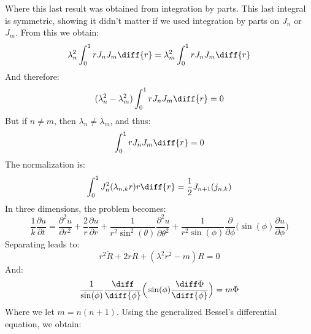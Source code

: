             Where this last result was obtained from integration
            by parts. This last integral is symmetric, showing
            it didn't matter if we used integration by parts on
            $J_{n}$ or $J_{m}$. From this we obtain:
            \begin{equation}
                \lambda_{n}^{2}\int_{0}^{1}rJ_{n}J_{m}\diff{r}
                =\lambda_{m}^{2}\int_{0}^{1}rJ_{n}J_{m}\diff{r}
            \end{equation}
            And therefore:
            \begin{equation}
                (\lambda_{n}^{2}-\lambda_{m}^{2})
                \int_{0}^{1}rJ_{n}J_{m}\diff{r}=0
            \end{equation}
            But if $n\ne{m}$, then $\lambda_{n}\ne\lambda_{m}$,
            and thus:
            \begin{equation}
                \int_{0}^{1}rJ_{n}J_{m}\diff{r}=0
            \end{equation}
            The normalization is:
            \begin{equation}
                \int_{0}^{1}J_{n}^{2}(\lambda_{n,k}r)r\diff{r}=
                \frac{1}{2}J_{n+1}(j_{n,k})
            \end{equation}
            In three dimensions, the problem becomes:
            \begin{equation}
                \frac{1}{k}\frac{\partial{u}}{\partial{t}}=
                \frac{\partial^{2}u}{\partial{r}^{2}}+
                \frac{2}{r}\frac{\partial{u}}{\partial{r}}+
                \frac{1}{r^{2}\sin^{2}(\theta)}
                \frac{\partial^{2}u}{\partial\theta^{2}}+
                \frac{1}{r^{2}\sin(\phi)}
                \frac{\partial}{\partial\phi}\Big(
                    \sin(\phi)\frac{\partial{u}}{\partial\phi}\Big)
            \end{equation}
            Separating leads to:
            \begin{equation}
                r^{2}\ddot{R}+2r\dot{R}+(\lambda^{2}r^{2}-m)R=0
            \end{equation}
            And:
            \begin{equation}
                \frac{1}{\sin(\phi)}\frac{\diff}{\diff{\phi}}
                    \Big(\sin(\phi)\frac{\diff\Phi}{\diff{\phi}}\Big)
                =m\Phi
            \end{equation}
            Where we let $m=n(n+1)$. Using the generalized Bessel's
            differential equation, we obtain:
